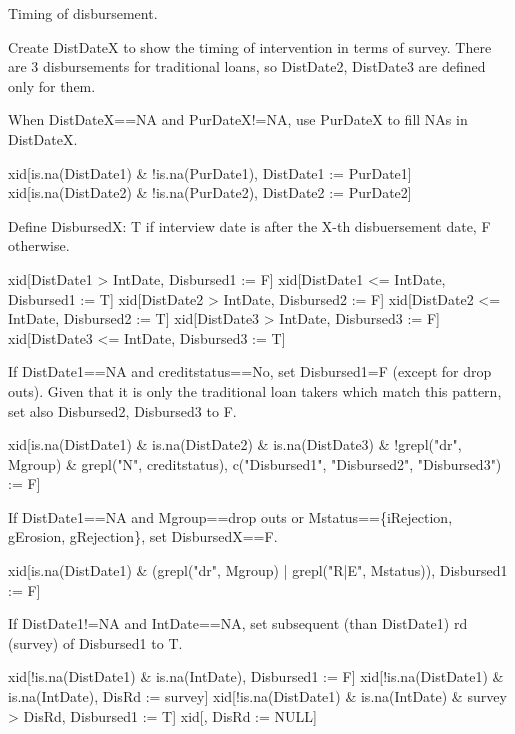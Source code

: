 

Timing of disbursement. 

Create \textsf{DistDateX} to show the timing of intervention in terms of survey. There are 3 disbursements for traditional loans, so \textsf{DistDate2}, \textsf{DistDate3} are defined only for them.  \gobblepars

When \textsf{DistDateX}==NA and \textsf{PurDateX}$!$=NA, use \textsf{PurDateX} to fill NAs in \textsf{DistDateX}. \gobblepars
\begin{Schunk}
\begin{Sinput}
xid[is.na(DistDate1) & !is.na(PurDate1), DistDate1 := PurDate1]
xid[is.na(DistDate2) & !is.na(PurDate2), DistDate2 := PurDate2]
\end{Sinput}
\end{Schunk}

Define \textsf{DisbursedX}: T if interview date is after the X-th disbuersement date, F otherwise. 
\begin{Schunk}
\begin{Sinput}
xid[DistDate1 > IntDate, Disbursed1 := F]
xid[DistDate1 <= IntDate, Disbursed1 := T]
xid[DistDate2 > IntDate, Disbursed2 := F]
xid[DistDate2 <= IntDate, Disbursed2 := T]
xid[DistDate3 > IntDate, Disbursed3 := F]
xid[DistDate3 <= IntDate, Disbursed3 := T]
\end{Sinput}
\end{Schunk}
If \textsf{DistDate1}==NA and \textsf{creditstatus}==No, set \textsf{Disbursed1}=F (except for drop outs). Given that it is only the traditional loan takers which match this pattern, set also \textsf{Disbursed2}, \textsf{Disbursed3} to F. \gobblepars
\begin{Schunk}
\begin{Sinput}
xid[is.na(DistDate1) & is.na(DistDate2) & is.na(DistDate3) & 
	!grepl("dr", Mgroup) & grepl("N", creditstatus), 
	c("Disbursed1", "Disbursed2", "Disbursed3") := F]
\end{Sinput}
\end{Schunk}
If \textsf{DistDate1}==NA  and \textsf{Mgroup}==drop outs or \textsf{Mstatus}==\{iRejection, gErosion, gRejection\}, set \textsf{DisbursedX}==F. 
\begin{Schunk}
\begin{Sinput}
xid[is.na(DistDate1) & (grepl("dr", Mgroup) | grepl("R|E", Mstatus)), Disbursed1 := F]
\end{Sinput}
\end{Schunk}
If \textsf{DistDate1}$!$=NA and \textsf{IntDate}==NA, set subsequent (than \textsf{DistDate1}) rd (\textsf{survey}) of \textsf{Disbursed1} to T. 
\begin{Schunk}
\begin{Sinput}
xid[!is.na(DistDate1) & is.na(IntDate), Disbursed1 := F]
xid[!is.na(DistDate1) & is.na(IntDate), DisRd := survey]
xid[!is.na(DistDate1) & is.na(IntDate) & survey > DisRd, Disbursed1 := T]
xid[, DisRd := NULL]
\end{Sinput}
\end{Schunk}

